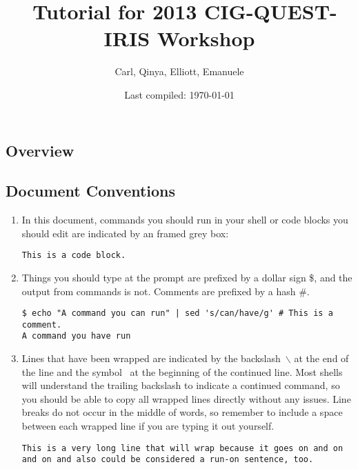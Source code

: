 \documentclass[10pt,fleqn,letterpaper]{article}
\title{\specfem\ Tutorial for 2013 CIG-QUEST-IRIS Workshop}
\author{Carl, Qinya, Elliott, Emanuele}
\date{Last compiled: \today}
\begin{document}

\maketitle



\subsection*{Overview}


\subsection*{Document Conventions}

\begin{enumerate}
\item In this document, commands you should run in your shell or code blocks
      you should edit are indicated by an framed grey box:
\begin{lstlisting}
This is a code block.
\end{lstlisting}

\item Things you should type at the prompt are prefixed by a dollar sign \$,
      and the output from commands is not. Comments are prefixed by a hash \#.
\begin{lstlisting}
$ echo "A command you can run" | sed 's/can/have/g' # This is a comment.
A command you have run
\end{lstlisting}

\item Lines that have been wrapped are indicated by the backslash~$\backslash$ at the
      end of the line and the symbol~\textcolor{red}{}
      at the beginning of the continued line. Most shells will understand the trailing
      backslash to indicate a continued command, so you should be able to copy all
      wrapped lines directly without any issues. Line breaks do not occur in the
      middle of words, so remember to include a space between each wrapped line if
      you are typing it out yourself.
\begin{lstlisting}
This is a very long line that will wrap because it goes on and on and on and also could be considered a run-on sentence, too.
\end{lstlisting}
\end{enumerate}
\end{document}

